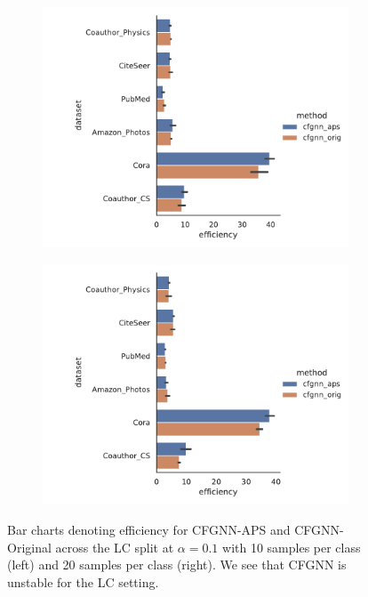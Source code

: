 \begin{figure}
    \centering
    \begin{subfigure}{0.48\linewidth}
        \includegraphics[width=\linewidth,alt={Bar charts denoting efficiency for CFGNN-APS and CFGNN-Original across the LC split at $\alpha=0.1$ with 10 samples per  class.}]{graphConformal/figures/nspc/cfgnn_aps_vs_orig_efficiency_10.png}
    \end{subfigure}
    \begin{subfigure}{0.48\linewidth}
        \includegraphics[width=\linewidth, alt={Bar charts denoting efficiency for CFGNN-APS and CFGNN-Original across the LC split at $\alpha=0.1$ with 20 samples per  class.}]{graphConformal/figures/nspc/cfgnn_aps_vs_orig_efficiency_20.png}
    \end{subfigure}
    \caption{Bar charts denoting efficiency for CFGNN-APS and CFGNN-Original across the LC split at $\alpha=0.1$ with 10 samples per  class (left) and 20 samples per class (right). We see that CFGNN is unstable for the LC setting.}
    \label{fig:nspc:conformal:cfgnn_aps_vs_orig}
\end{figure}

